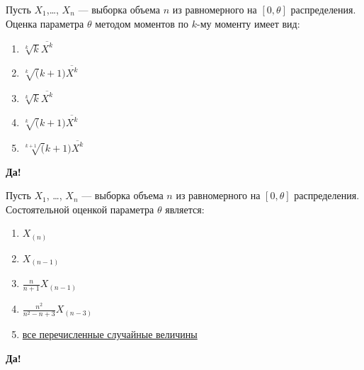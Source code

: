 \documentclass[t]{beamer}
\begin{document}
 \begin{frame} \label{34-Yes} 
\begin{block}{34} 

Пусть $X_1$,\ldots, $X_n$ — выборка объема $n$ из равномерного на $[0, \theta]$ распределения. Оценка параметра $\theta$ методом моментов по $k$-му моменту имеет вид:
 


 \end{block} 
\begin{enumerate} 
\item[] \hyperlink{34-No}{\beamergotobutton{} $\sqrt[k]k \overline{X^k}$}
\item[] \hyperlink{34-No}{\beamergotobutton{} $\sqrt[k](k+1) \overline{X^k}$}
\item[] \hyperlink{34-No}{\beamergotobutton{} $\sqrt[k]k \overline{X^k}$}
\item[] \hyperlink{34-Yes}{\beamergotobutton{} $\sqrt[k](k+1) \overline{X^k}$}
\item[] \hyperlink{34-No}{\beamergotobutton{} $\sqrt[k+1](k+1) \overline{X^k}$}
\end{enumerate} 

 \textbf{Да!} 
 \hyperlink{35}{}\end{frame} 


 \begin{frame} \label{35-Yes} 
\begin{block}{35} 

Пусть $X_1$, \ldots, $X_n$ — выборка объема $n$ из равномерного на $[0, \theta]$ распределения. Состоятельной оценкой параметра $\theta$ является:
 


 \end{block} 
\begin{enumerate} 
\item[] \hyperlink{35-No}{\beamergotobutton{} $X_(n)$}
\item[] \hyperlink{35-No}{\beamergotobutton{} $X_(n-1)$}
\item[] \hyperlink{35-No}{\beamergotobutton{} $\frac{n}{n+1} X_{(n-1)}$}
\item[] \hyperlink{35-No}{\beamergotobutton{} $\frac{n^2}{n^2-n+3} X_{(n-3)}$}
\item[] \hyperlink{35-Yes}{\beamergotobutton{} все перечисленные случайные величины}
\end{enumerate} 

 \textbf{Да!} 
 \hyperlink{36}{}\end{frame} 
\end{document}
